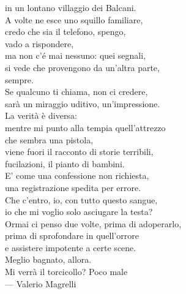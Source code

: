 \begin{quoting}
\begin{flushright}
{in un lontano villaggio dei Balcani. \\
A volte ne esce uno squillo familiare, \\
credo che sia il telefono, spengo, \\
vado a rispondere, \\
ma non c’é mai nessuno: quei segnali, \\
si vede che provengono da un’altra parte, \\
sempre. \\
Se qualcuno ti chiama, non ci credere,\\
sarà un miraggio uditivo, un’impressione. \\
La verità è diversa: \\
mentre mi punto alla tempia quell’attrezzo \\
che sembra una pistola, \\
viene fuori il racconto di storie terribili, \\
fucilazioni, il pianto di bambini. \\
E’ come una confessione non richiesta, \\
una registrazione spedita per errore. \\
Che c’entro, io, con tutto questo sangue, \\
io che mi voglio solo asciugare la testa? \\
Ormai ci penso due volte, prima di adoperarlo, \\
prima di sprofondare in quell’orrore \\
e assistere impotente a certe scene. \\
Meglio bagnato, allora. \\
Mi verrà il torcicollo? Poco male} \\ \medskip
--- Valerio Magrelli%

\end{flushright}
\end{quoting}